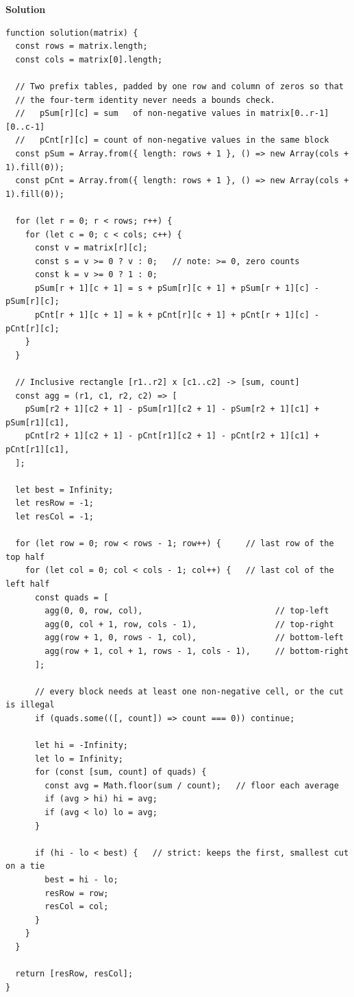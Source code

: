\documentclass[11pt,a4paper]{article}
\newcommand{\blk}[1]{\par\smallskip\noindent\textbf{\color{accent}#1}\par\nopagebreak}
\begin{document}
\blk{Solution}
\begin{lstlisting}
function solution(matrix) {
  const rows = matrix.length;
  const cols = matrix[0].length;

  // Two prefix tables, padded by one row and column of zeros so that
  // the four-term identity never needs a bounds check.
  //   pSum[r][c] = sum   of non-negative values in matrix[0..r-1][0..c-1]
  //   pCnt[r][c] = count of non-negative values in the same block
  const pSum = Array.from({ length: rows + 1 }, () => new Array(cols + 1).fill(0));
  const pCnt = Array.from({ length: rows + 1 }, () => new Array(cols + 1).fill(0));

  for (let r = 0; r < rows; r++) {
    for (let c = 0; c < cols; c++) {
      const v = matrix[r][c];
      const s = v >= 0 ? v : 0;   // note: >= 0, zero counts
      const k = v >= 0 ? 1 : 0;
      pSum[r + 1][c + 1] = s + pSum[r][c + 1] + pSum[r + 1][c] - pSum[r][c];
      pCnt[r + 1][c + 1] = k + pCnt[r][c + 1] + pCnt[r + 1][c] - pCnt[r][c];
    }
  }

  // Inclusive rectangle [r1..r2] x [c1..c2] -> [sum, count]
  const agg = (r1, c1, r2, c2) => [
    pSum[r2 + 1][c2 + 1] - pSum[r1][c2 + 1] - pSum[r2 + 1][c1] + pSum[r1][c1],
    pCnt[r2 + 1][c2 + 1] - pCnt[r1][c2 + 1] - pCnt[r2 + 1][c1] + pCnt[r1][c1],
  ];

  let best = Infinity;
  let resRow = -1;
  let resCol = -1;

  for (let row = 0; row < rows - 1; row++) {     // last row of the top half
    for (let col = 0; col < cols - 1; col++) {   // last col of the left half
      const quads = [
        agg(0, 0, row, col),                           // top-left
        agg(0, col + 1, row, cols - 1),                // top-right
        agg(row + 1, 0, rows - 1, col),                // bottom-left
        agg(row + 1, col + 1, rows - 1, cols - 1),     // bottom-right
      ];

      // every block needs at least one non-negative cell, or the cut is illegal
      if (quads.some(([, count]) => count === 0)) continue;

      let hi = -Infinity;
      let lo = Infinity;
      for (const [sum, count] of quads) {
        const avg = Math.floor(sum / count);   // floor each average
        if (avg > hi) hi = avg;
        if (avg < lo) lo = avg;
      }

      if (hi - lo < best) {   // strict: keeps the first, smallest cut on a tie
        best = hi - lo;
        resRow = row;
        resCol = col;
      }
    }
  }

  return [resRow, resCol];
}
\end{lstlisting}
\end{document}
